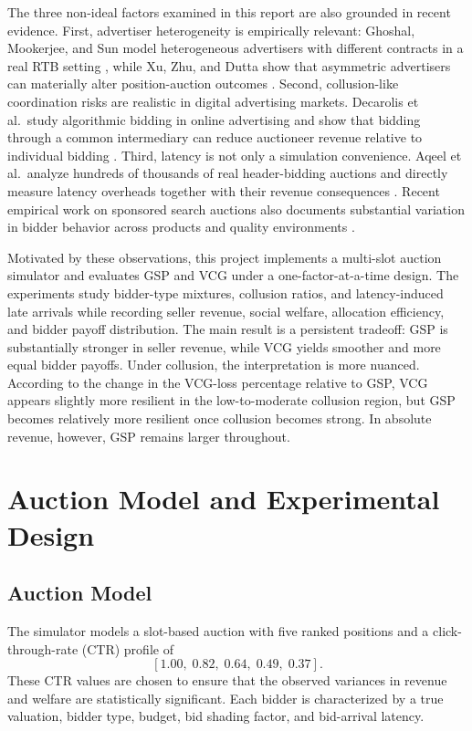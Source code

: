 \documentclass[12pt,a4paper]{article}
\begin{document}
The three non-ideal factors examined in this report are also grounded in recent evidence. First, advertiser heterogeneity is empirically relevant: Ghoshal, Mookerjee, and Sun model heterogeneous advertisers with different contracts in a real RTB setting \cite{ghoshal2023}, while Xu, Zhu, and Dutta show that asymmetric advertisers can materially alter position-auction outcomes \cite{xu2023}. Second, collusion-like coordination risks are realistic in digital advertising markets. Decarolis et al.\ study algorithmic bidding in online advertising and show that bidding through a common intermediary can reduce auctioneer revenue relative to individual bidding \cite{decarolis2024}. Third, latency is not only a simulation convenience. Aqeel et al.\ analyze hundreds of thousands of real header-bidding auctions and directly measure latency overheads together with their revenue consequences \cite{aqeel2020}. Recent empirical work on sponsored search auctions also documents substantial variation in bidder behavior across products and quality environments \cite{kim2025}. 

Motivated by these observations, this project implements a multi-slot auction simulator and evaluates GSP and VCG under a one-factor-at-a-time design. The experiments study bidder-type mixtures, collusion ratios, and latency-induced late arrivals while recording seller revenue, social welfare, allocation efficiency, and bidder payoff distribution. The main result is a persistent tradeoff: GSP is substantially stronger in seller revenue, while VCG yields smoother and more equal bidder payoffs. Under collusion, the interpretation is more nuanced. According to the change in the VCG-loss percentage relative to GSP, VCG appears slightly more resilient in the low-to-moderate collusion region, but GSP becomes relatively more resilient once collusion becomes strong. In absolute revenue, however, GSP remains larger throughout.

\section{Auction Model and Experimental Design}

\subsection{Auction Model}

The simulator models a slot-based auction with five ranked positions and a click-through-rate (CTR) profile of
\[
[1.00,\; 0.82,\; 0.64,\; 0.49,\; 0.37].
\]
These CTR values are chosen to ensure that the observed variances in revenue and welfare are statistically significant.
Each bidder is characterized by a true valuation, bidder type, budget, bid shading factor, and bid-arrival latency.
\end{document}
